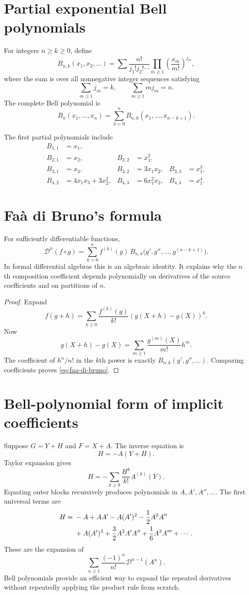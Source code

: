 \documentclass[11pt,oneside]{book}
\theoremstyle{definition}
\theoremstyle{remark}
\newcommand{\D}{\mathcal D}
\newcommand{\compose}{\mathbin{\circ}}
\begin{document}
\section{Partial exponential Bell polynomials}
For integers $n\ge k\ge0$, define
\begin{equation}\label{eq:bell-definition}
 B_{n,k}(x_1,x_2,\ldots)
 =
 \sum
 \frac{n!}{j_1!j_2!\cdots}
 \prod_{m\ge1}\left(\frac{x_m}{m!}\right)^{j_m},
\end{equation}
where the sum is over all nonnegative integer sequences satisfying
\[
 \sum_{m\ge1}j_m=k,\qquad
 \sum_{m\ge1}m j_m=n.
\]
The complete Bell polynomial is
\[
 B_n(x_1,\ldots,x_n)=\sum_{k=0}^nB_{n,k}(x_1,\ldots,x_{n-k+1}).
\]

The first partial polynomials include
\begin{align*}
 B_{1,1}&=x_1,\\
 B_{2,1}&=x_2,&B_{2,2}&=x_1^2,\\
 B_{3,1}&=x_3,&B_{3,2}&=3x_1x_2,&B_{3,3}&=x_1^3,\\
 B_{4,2}&=4x_1x_3+3x_2^2,&
 B_{4,3}&=6x_1^2x_2,&B_{4,4}&=x_1^4.
\end{align*}

\section{Fa\`a di Bruno's formula}
For sufficiently differentiable functions,
\begin{equation}\label{eq:faa-di-bruno}
 \D^n(f\compose g)
 =
 \sum_{k=0}^{n}
 f^{(k)}(g)\,
 B_{n,k}\bigl(g',g'',\ldots,g^{(n-k+1)}\bigr).
\end{equation}
In formal differential algebras this is an algebraic identity. It explains
why the $n$th composition coefficient depends polynomially on derivatives
of the source coefficients and on partitions of $n$.

\begin{proof}
Expand
\[
 f(g+h)=\sum_{k\ge0}\frac{f^{(k)}(g)}{k!}
       (g(X+h)-g(X))^k.
\]
Now
\[
 g(X+h)-g(X)
 =\sum_{m\ge1}\frac{g^{(m)}(X)}{m!}h^m.
\]
The coefficient of $h^n/n!$ in the $k$th power is exactly
$B_{n,k}(g',g'',\ldots)$. Comparing coefficients proves
\eqref{eq:faa-di-bruno}.
\end{proof}

\section{Bell-polynomial form of implicit coefficients}
Suppose $G=Y+H$ and $F=X+A$. The inverse equation is
\[
 H=-A(Y+H).
\]
Taylor expansion gives
\[
 H=-\sum_{k\ge0}\frac{H^k}{k!}A^{(k)}(Y).
\]
Equating outer blocks recursively produces polynomials in
$A,A',A'',\ldots$. The first universal terms are
\begin{align}
 H={}&-A+AA'
 -A(A')^2-\frac12A^2A''\notag\\
 &+A(A')^3+\frac32A^2A'A''
 +\frac16A^3A'''+\cdots.
 \label{eq:universal-inverse-derivatives}
\end{align}
These are the expansion of
\[
 \sum_{n\ge1}\frac{(-1)^n}{n!}\D^{n-1}(A^n).
\]
Bell polynomials provide an efficient way to expand the repeated
derivatives without repeatedly applying the product rule from scratch.
\end{document}
